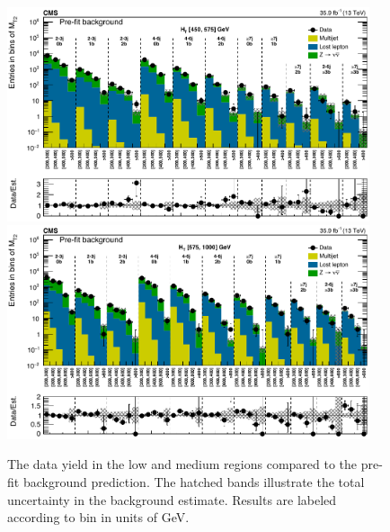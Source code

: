 \begin{figure}
	\centering
	\includegraphics[width=0.95\textwidth]{results/figs/mt2_lowHT_fullEstimate}
	\includegraphics[width=0.95\textwidth]{results/figs/mt2_mediumHT_fullEstimate}
	\caption{The data yield in the low \HT and medium \HT regions compared to the pre-fit background prediction. The hatched bands illustrate the total uncertainty in the background estimate. Results are labeled according to \mttwo bin in units of GeV.}
	\label{fig:yieldPrefit2}
\end{figure}
